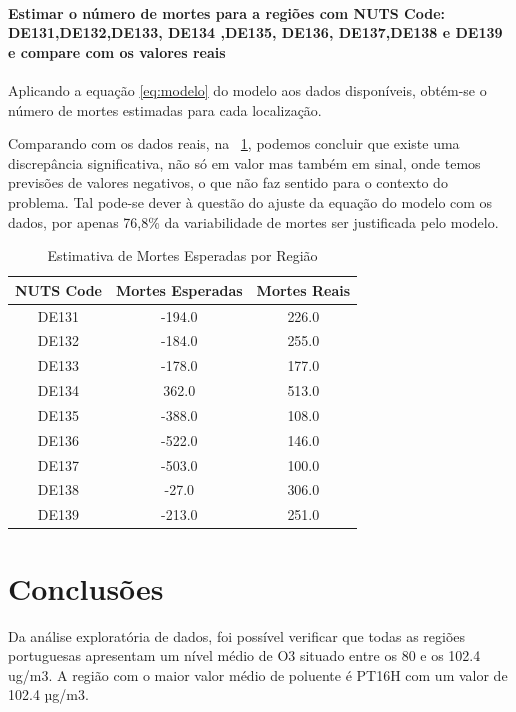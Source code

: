 \documentclass[conference]{IEEEtran}
\begin{document}
\medskip
\paragraph{\textbf{Estimar o número de mortes para a regiões com NUTS Code: DE131,DE132,DE133, DE134 ,DE135, DE136, DE137,DE138 e DE139 e compare com os valores reais}}


Aplicando a equação \eqref{eq:modelo} do modelo aos dados disponíveis, obtém-se o número de mortes estimadas para cada localização. 

Comparando com os dados reais, na \tablename~\ref{tab:mortes_esperadas}, podemos concluir que existe uma discrepância significativa, não só em valor mas também em sinal, onde temos previsões de valores negativos, o que não faz sentido para o contexto do problema.
Tal pode-se dever à questão do ajuste da equação do modelo com os dados, por apenas 76,8\% da variabilidade de mortes ser justificada pelo modelo.


\begin{table}[h]
	\centering
		\caption{Estimativa de Mortes Esperadas por Região}
	\begin{tabular}{|c|c|c|}
		\hline
		\textbf{NUTS Code} & \textbf{Mortes Esperadas} & \textbf{Mortes Reais} \\
		\hline
		DE131 & -194.0 & 226.0 \\
		DE132 & -184.0 & 255.0 \\
		DE133 & -178.0 & 177.0 \\
		DE134 & 362.0  & 513.0 \\
		DE135 & -388.0 & 108.0 \\
		DE136 & -522.0 & 146.0 \\
		DE137 & -503.0 & 100.0 \\
		DE138 & -27.0  & 306.0 \\
		DE139 & -213.0 & 251.0 \\
		\hline
	\end{tabular}
	\label{tab:mortes_esperadas}
\end{table}


\section*{Conclusões}

Da análise exploratória de dados, foi possível verificar que todas as regiões portuguesas apresentam um nível médio de O3 situado entre os 80 e os 102.4 ug/m3. A região com o maior valor médio de poluente é PT16H com um valor de 102.4 µg/m3.
\end{document}
